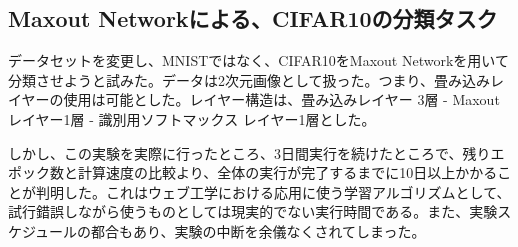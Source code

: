 \subsection{Maxout Networkによる、CIFAR10の分類タスク}
データセットを変更し、MNISTではなく、CIFAR10をMaxout Networkを用いて分類させようと試みた。データは2次元画像として扱った。つまり、畳み込みレイヤーの使用は可能とした。レイヤー構造は、畳み込みレイヤー 3層 - Maxout レイヤー1層 - 識別用ソフトマックス レイヤー1層とした。\par
しかし、この実験を実際に行ったところ、3日間実行を続けたところで、残りエポック数と計算速度の比較より、全体の実行が完了するまでに10日以上かかることが判明した。これはウェブ工学における応用に使う学習アルゴリズムとして、試行錯誤しながら使うものとしては現実的でない実行時間である。また、実験スケジュールの都合もあり、実験の中断を余儀なくされてしまった。%